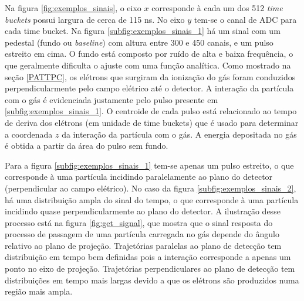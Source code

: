 \documentclass[a4paper,12pt,oneside]{book}
\begin{document}
\par Na figura \ref{fig:exemplos_sinais}, o eixo $x$ corresponde à cada um dos 512 \textit{time buckets} possui largura de cerca de 115 ns. No eixo $y$ tem-se o canal de ADC para cada time bucket. Na figura \ref{subfig:exemplos_sinais_1} há um sinal com um pedestal (fundo ou \textit{baseline}) com altura entre 300 e 450 canais, e um pulso estreito em cima. O fundo está composto por ruído de alta e baixa frequência, o que geralmente dificulta o ajuste com uma função analítica. Como mostrado na seção \ref{PATTPC}, os elétrons que surgiram da ionização do gás foram conduzidos perpendicularmente pelo campo elétrico até o detector. A interação da partícula com o gás é evidenciada justamente pelo pulso presente em \ref{subfig:exemplos_sinais_1}. O centroide de cada pulso está relacionado ao tempo de deriva dos elétrons (em unidade de time buckets) que é usado para determinar a coordenada $z$ da interação da partícula com o gás. A energia depositada no gás é obtida a partir da área do pulso sem fundo.


\par Para a figura \ref{subfig:exemplos_sinais_1} tem-se apenas um pulso estreito, o que corresponde à uma partícula incidindo paralelamente ao plano do detector (perpendicular ao campo elétrico). No caso da figura \ref{subfig:exemplos_sinais_2}, há uma distribuição ampla do sinal do tempo, o que corresponde à uma partícula incidindo quase perpendicularmente ao plano do detector. A ilustração desse processo está na figura \ref{fig:get_signal}, que mostra que o sinal resposta do processo de passagem de uma partícula carregada no gás depende do ângulo relativo ao plano de projeção. Trajetórias paralelas ao plano de detecção tem distribuição em tempo bem definidas pois a interação corresponde a apenas um ponto no eixo de projeção. Trajetórias perpendiculares ao plano de detecção tem distribuições em tempo mais largas devido a que os elétrons são produzidos numa região mais ampla.


\end{document}
